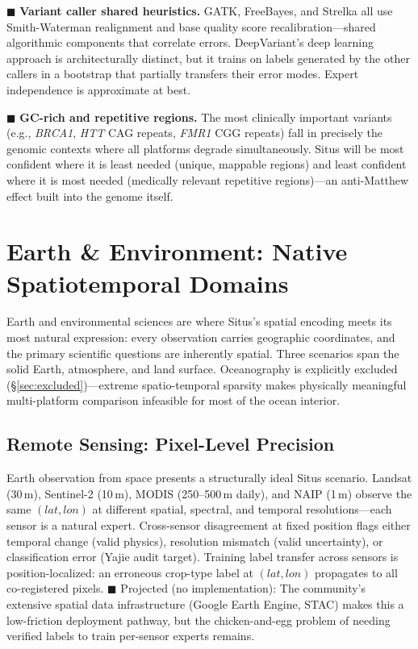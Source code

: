\documentclass[12pt,a4paper]{article}
\begin{document}
\textcolor{warning}{$\blacksquare$ \textbf{Variant caller shared heuristics.}} GATK, FreeBayes, and Strelka all use Smith-Waterman realignment and base quality score recalibration---shared algorithmic components that correlate errors. DeepVariant's deep learning approach is architecturally distinct, but it trains on labels generated by the other callers in a bootstrap that partially transfers their error modes. Expert independence is approximate at best.

\textcolor{warning}{$\blacksquare$ \textbf{GC-rich and repetitive regions.}} The most clinically important variants (e.g., \textit{BRCA1}, \textit{HTT} CAG repeats, \textit{FMR1} CGG repeats) fall in precisely the genomic contexts where all platforms degrade simultaneously. Situs will be most confident where it is least needed (unique, mappable regions) and least confident where it is most needed (medically relevant repetitive regions)---an anti-Matthew effect built into the genome itself.

\section{Earth \& Environment: Native Spatiotemporal Domains}
\label{sec:earth}

Earth and environmental sciences are where Situs's spatial encoding meets its most natural expression: every observation carries geographic coordinates, and the primary scientific questions are inherently spatial. Three scenarios span the solid Earth, atmosphere, and land surface. Oceanography is explicitly excluded (\S\ref{sec:excluded})---extreme spatio-temporal sparsity makes physically meaningful multi-platform comparison infeasible for most of the ocean interior.

\subsection{Remote Sensing: Pixel-Level Precision}

Earth observation from space presents a structurally ideal Situs scenario. Landsat (30\,m), Sentinel-2 (10\,m), MODIS (250--500\,m daily), and NAIP (1\,m) observe the same $(lat,lon)$ at different spatial, spectral, and temporal resolutions—each sensor is a natural expert. Cross-sensor disagreement at fixed position flags either temporal change (valid physics), resolution mismatch (valid uncertainty), or classification error (Yajie audit target). Training label transfer across sensors is position-localized: an erroneous crop-type label at $(lat,lon)$ propagates to all co-registered pixels. \textcolor{projected}{$\blacksquare$ Projected (no implementation)}: The community's extensive spatial data infrastructure (Google Earth Engine, STAC) makes this a low-friction deployment pathway, but the chicken-and-egg problem of needing verified labels to train per-sensor experts remains.
\end{document}
